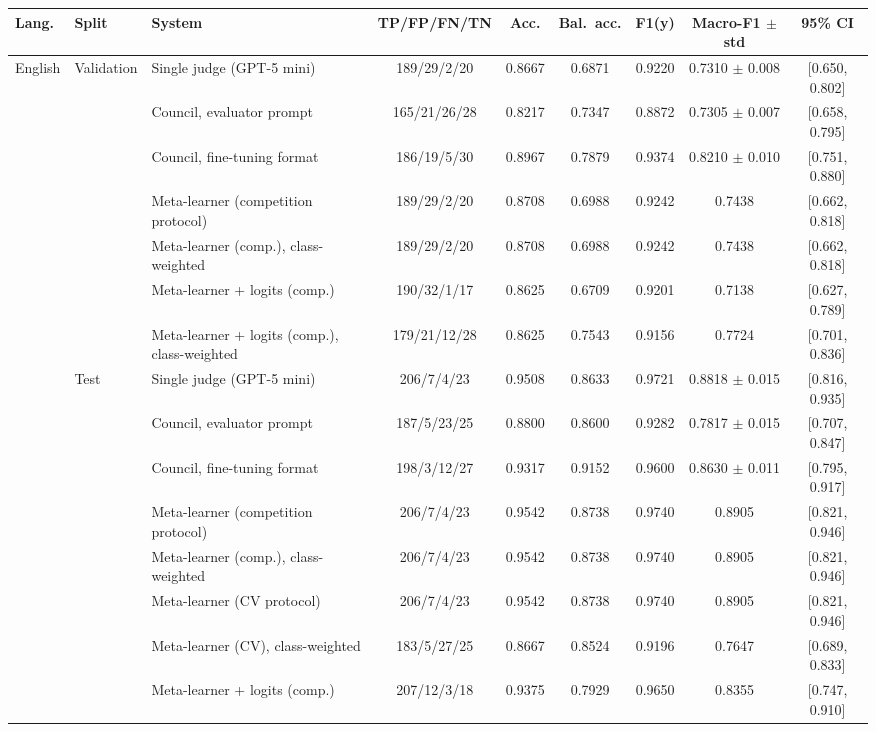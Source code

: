 \begin{tabular}{lllcccccc}
\hline
\textbf{Lang.} & \textbf{Split} & \textbf{System} & \textbf{TP/FP/FN/TN} & \textbf{Acc.} & \textbf{Bal.~acc.} & \textbf{F1(y)} & \textbf{Macro-F1 $\pm$ std} & \textbf{95\% CI} \\
\hline
English & Validation & Single judge (GPT-5 mini) & 189/29/2/20 & 0.8667 & 0.6871 & 0.9220 & 0.7310 $\pm$ 0.008 & [0.650, 0.802] \\
 &  & Council, evaluator prompt & 165/21/26/28 & 0.8217 & 0.7347 & 0.8872 & 0.7305 $\pm$ 0.007 & [0.658, 0.795] \\
 &  & Council, fine-tuning format & 186/19/5/30 & 0.8967 & 0.7879 & 0.9374 & 0.8210 $\pm$ 0.010 & [0.751, 0.880] \\
 &  & Meta-learner (competition protocol) & 189/29/2/20 & 0.8708 & 0.6988 & 0.9242 & 0.7438 & [0.662, 0.818] \\
 &  & Meta-learner (comp.), class-weighted & 189/29/2/20 & 0.8708 & 0.6988 & 0.9242 & 0.7438 & [0.662, 0.818] \\
 &  & Meta-learner + logits (comp.) & 190/32/1/17 & 0.8625 & 0.6709 & 0.9201 & 0.7138 & [0.627, 0.789] \\
 &  & Meta-learner + logits (comp.), class-weighted & 179/21/12/28 & 0.8625 & 0.7543 & 0.9156 & 0.7724 & [0.701, 0.836] \\
 & Test & Single judge (GPT-5 mini) & 206/7/4/23 & 0.9508 & 0.8633 & 0.9721 & 0.8818 $\pm$ 0.015 & [0.816, 0.935] \\
 &  & Council, evaluator prompt & 187/5/23/25 & 0.8800 & 0.8600 & 0.9282 & 0.7817 $\pm$ 0.015 & [0.707, 0.847] \\
 &  & Council, fine-tuning format & 198/3/12/27 & 0.9317 & 0.9152 & 0.9600 & 0.8630 $\pm$ 0.011 & [0.795, 0.917] \\
 &  & Meta-learner (competition protocol) & 206/7/4/23 & 0.9542 & 0.8738 & 0.9740 & 0.8905 & [0.821, 0.946] \\
 &  & Meta-learner (comp.), class-weighted & 206/7/4/23 & 0.9542 & 0.8738 & 0.9740 & 0.8905 & [0.821, 0.946] \\
 &  & Meta-learner (CV protocol) & 206/7/4/23 & 0.9542 & 0.8738 & 0.9740 & 0.8905 & [0.821, 0.946] \\
 &  & Meta-learner (CV), class-weighted & 183/5/27/25 & 0.8667 & 0.8524 & 0.9196 & 0.7647 & [0.689, 0.833] \\
 &  & Meta-learner + logits (comp.) & 207/12/3/18 & 0.9375 & 0.7929 & 0.9650 & 0.8355 & [0.747, 0.910] \\

\end{tabular}
